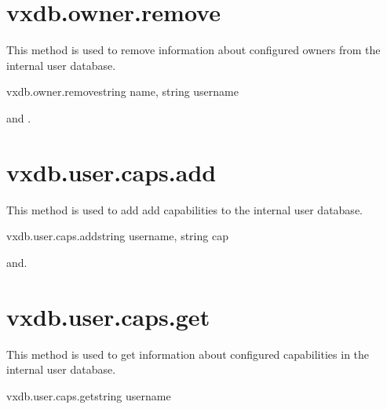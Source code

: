 
\rpcnoerrors


\section{vxdb.owner.remove}

This method is used to remove information about configured owners from the
internal user database.

\begin{rpcsynopsis}{vxdb.owner.remove}{string name, string username}
\end{rpcsynopsis}

\begin{rpcaccess}
 and \rpcnoownerchecks.
\end{rpcaccess}

\rpcreturnnil

\rpcnoerrors


\section{vxdb.user.caps.add}

This method is used to add add capabilities to the internal user database.

\begin{rpcsynopsis}{vxdb.user.caps.add}{string username, string cap}
\end{rpcsynopsis}

\begin{rpcaccess}
 and\rpcnoownerchecks.
\end{rpcaccess}

\rpcreturnnil

\rpcnoerrors


\section{vxdb.user.caps.get}

This method is used to get information about configured capabilities in the
internal user database.

\begin{rpcsynopsis}{vxdb.user.caps.get}{string username}
\end{rpcsynopsis}

